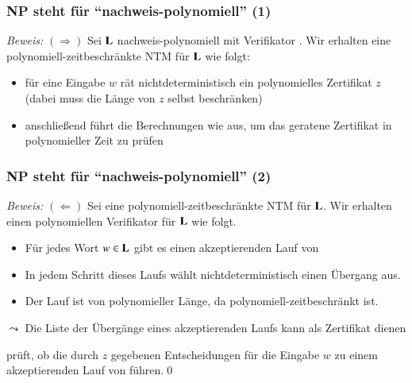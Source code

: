 \documentclass[aspectratio=1610,onlymath]{beamer}
\begin{document}
\begin{frame}[t]\frametitle{NP steht für "`nachweis-polynomiell"' (1)}

\medskip\pause

\emph{Beweis:}
$(\Rightarrow)$ Sei $\textbf{\textcolor{black}{L}}$ nachweis-polynomiell mit Verifikator . Wir erhalten eine polynomiell-zeitbeschränkte NTM  für $\textbf{\textcolor{black}{L}}$ wie folgt:\pause
\begin{itemize}
\item für eine Eingabe $w$ rät  nichtdeterministisch ein polynomielles Zertifikat $z$\\
(dabei muss  die Länge von $z$ selbst beschränken)
\item anschließend führt  die Berechnungen wie  aus, um das geratene Zertifikat in polynomieller Zeit zu prüfen
\end{itemize}

\end{frame}

\begin{frame}[t]\frametitle{NP steht für "`nachweis-polynomiell"' (2)}

\medskip

\emph{Beweis:}
$(\Leftarrow)$ Sei  eine polynomiell-zeitbeschränkte NTM für $\textbf{\textcolor{black}{L}}$. Wir erhalten einen polynomiellen Verifikator  für $\textbf{\textcolor{black}{L}}$ wie folgt.\pause
% 
\begin{itemize}
\item Für jedes Wort $w\in\textbf{\textcolor{black}{L}}$ gibt es einen akzeptierenden Lauf von 
\item In jedem Schritt dieses Laufs wählt  nichtdeterministisch einen Übergang aus.
\item Der Lauf ist von polynomieller Länge, da  polynomiell-zeitbeschränkt ist.
\end{itemize}\pause
$\leadsto$ Die Liste der Übergänge eines akzeptierenden Laufs kann als Zertifikat dienen
\medskip

 prüft, ob die durch $z$ gegebenen Entscheidungen für die Eingabe $w$ zu einem akzeptierenden Lauf von  führen.\qed 

\end{frame}
\end{document}
